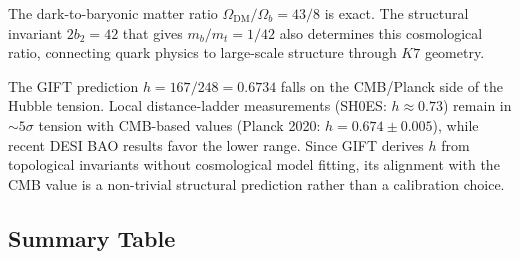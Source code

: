 \documentclass[11pt,a4paper]{article}
\newcommand{\Kseven}{K_7}
\def\Kseven{K7}%
\begin{document}
The dark-to-baryonic matter ratio $\Omega_{\mathrm{DM}}/\Omega_b = 43/8$ is exact. The structural invariant $2b_2 = 42$ that gives $m_b/m_t = 1/42$ also determines this cosmological ratio, connecting quark physics to large-scale structure through $\Kseven$ geometry.

The GIFT prediction $h = 167/248 = 0.6734$ falls on the CMB/Planck side of the Hubble tension. Local distance-ladder measurements (SH0ES: $h \approx 0.73$) remain in $\sim 5\sigma$ tension with CMB-based values (Planck 2020: $h = 0.674 \pm 0.005$), while recent DESI BAO results favor the lower range. Since GIFT derives $h$ from topological invariants without cosmological model fitting, its alignment with the CMB value is a non-trivial structural prediction rather than a calibration choice.

\subsection{Summary Table}
\end{document}
